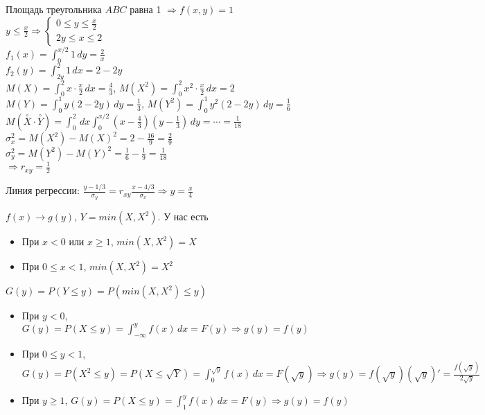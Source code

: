 \begin{exercise}[9]
	Площадь треугольника $ABC$ равна 1 $\Rightarrow f(x, y) = 1$ \\ $y \leq \frac{x}{2} \Rightarrow \begin{cases}
		0 \leq y \leq \frac{x}{2} \\ 2y \leq x \leq 2
	\end{cases}$ \\ $f_1(x) = \int_{0}^{x/2}1\,dy = \frac{2}{x}$ \\ $f_2(y) = \int_{2y}^{2}1\,dx = 2-2y$ \\ $M(X) = \int_{0}^{2}x \cdot \frac{x}{2}\,dx = \frac{4}{3}$, $M(X^2) = \int_{0}^{2}x^2 \cdot \frac{x}{2}\,dx = 2$ \\ $M(Y) = \int_{0}^{1}y(2-2y)\,dy = \frac{1}{3}$,  $M(Y^2) = \int_{0}^{1}y^2(2-2y)\,dy=\frac{1}{6}$ \\ $M(\overset{\circ}{X}\cdot \overset{\circ}{Y}) = \int_{0}^{2}\,dx\int_{0}^{x/2}(x-\frac{4}{3})(y-\frac{1}{3})\,dy = \cdots = \frac{1}{18}$ \\ $\sigma_x^2 = M(X^2)-M(X)^2=2-\frac{16}{9}=\frac{2}{9}$ \\ $\sigma_y^2 = M(Y^2)-M(Y)^2=\frac{1}{6} - \frac{1}{9} = \frac{1}{18}$ \\ $\Rightarrow r_{xy} = \frac{1}{2}$

	Линия регрессии: $\frac{y-1/3}{\sigma_y} = r_{xy}\frac{x-4/3}{\sigma_x} \Rightarrow y = \frac{x}{4}$
\end{exercise}

\begin{exercise}[11]
	$f(x) \rightarrow g(y)$, $Y = min(X, X^2)$. У нас есть
	\begin{itemize}
		\item При $x<0$ или $x \geq 1$, $min(X, X^2)=X$
		\item При $0 \leq x < 1$, $min(X, X^2)=X^2$
	\end{itemize}
	$G(y) = P(Y \leq y) = P(min(X, X^2) \leq y)$
	\begin{itemize}
		\item При $y < 0$, $G(y) = P(X \leq y) = \int_{-\infty}^{y}f(x)\,dx = F(y) \Rightarrow g(y)=f(y)$
		\item При $0 \leq y < 1$, $G(y) = P(X^2 \leq y) = P(X \leq \sqrt{Y}) = \int_{0}^{\sqrt{y}}f(x)\,dx = F(\sqrt{y}) \Rightarrow g(y) = f(\sqrt{y})(\sqrt{y})'=\frac{f(\sqrt{y})}{2\sqrt{y}}$
		\item При $y \geq 1$, $G(y) = P(X \leq y) = \int_{1}^{y}f(x)\,dx = F(y) \Rightarrow g(y)=f(y)$
	\end{itemize}
\end{exercise}

